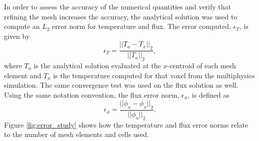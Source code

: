 \documentclass[letterpaper]{mc2023}
\begin{document}
In order to assess the accuracy of the numerical quantities and verify that refining the mesh increases the accuracy, the analytical solution
was used to compute an $L_{2}$ error norm for temperature and flux. The error computed, $\epsilon_{T}$, is given by
\begin{equation}
    \epsilon_{T} = \frac{|| T_{a} - T_{x} ||_{2}}{|| T_{a} ||_{2}},
\end{equation}
where $T_{a}$ is the analytical solution evaluated at the $x$-centroid of each mesh element and $T_{x}$ is the temperature computed for that
voxel from the multiphysics simulation. The same convergence test was used on the flux solution as well. Using the same notation convention,
the flux error norm, $\epsilon_{\phi}$, is defined as
\begin{equation}
    \epsilon_{\phi} =  \frac{|| \phi_{a} - \phi_{x} ||_{2}}{|| \phi_{a} ||_{2}}.
\end{equation}
Figure \ref{fig:error_study} shows how the temperature and flux error norms relate to the number of mesh elements and cells used.
\end{document}
